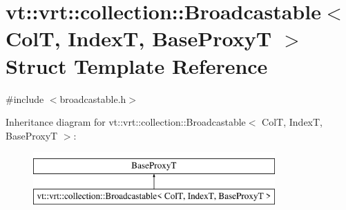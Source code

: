 \hypertarget{structvt_1_1vrt_1_1collection_1_1_broadcastable}{}\section{vt\+:\+:vrt\+:\+:collection\+:\+:Broadcastable$<$ ColT, IndexT, Base\+ProxyT $>$ Struct Template Reference}
\label{structvt_1_1vrt_1_1collection_1_1_broadcastable}


{\ttfamily \#include $<$broadcastable.\+h$>$}

Inheritance diagram for vt\+:\+:vrt\+:\+:collection\+:\+:Broadcastable$<$ ColT, IndexT, Base\+ProxyT $>$\+:\begin{figure}[H]
\begin{center}
\leavevmode
\includegraphics[height=2.000000cm]{structvt_1_1vrt_1_1collection_1_1_broadcastable}
\end{center}
\end{figure}
